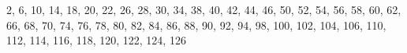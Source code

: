 2, 6, 10, 14, 18, 20, 22, 26, 28, 30, 34, 38, 40, 42, 44, 46, 50, 52, 54, 56, 58, 60, 62, 66, 68, 70, 74, 76, 78, 80, 82, 84, 86, 88, 90, 92, 94, 98, 100, 102, 104, 106, 110, 112, 114, 116, 118, 120, 122, 124, 126
